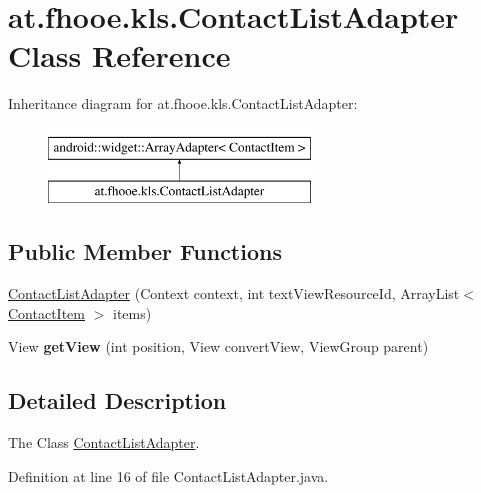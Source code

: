 \hypertarget{classat_1_1fhooe_1_1kls_1_1_contact_list_adapter}{\section{at.\-fhooe.\-kls.\-Contact\-List\-Adapter Class Reference}
\label{classat_1_1fhooe_1_1kls_1_1_contact_list_adapter}
}
Inheritance diagram for at.\-fhooe.\-kls.\-Contact\-List\-Adapter\-:\begin{figure}[H]
\begin{center}
\leavevmode
\includegraphics[height=2.000000cm]{classat_1_1fhooe_1_1kls_1_1_contact_list_adapter}
\end{center}
\end{figure}
\subsection*{Public Member Functions}
\begin{DoxyCompactItemize}
\item 
\hyperlink{classat_1_1fhooe_1_1kls_1_1_contact_list_adapter_a693544ab74ebbf47d3a5a9f7549087c9}{Contact\-List\-Adapter} (Context context, int text\-View\-Resource\-Id, Array\-List$<$ \hyperlink{classat_1_1fhooe_1_1kls_1_1_contact_item}{Contact\-Item} $>$ items)
\item 
\hypertarget{classat_1_1fhooe_1_1kls_1_1_contact_list_adapter_a99359a6cbb2a064fa46c2aef14e5b8eb}{View {\bfseries get\-View} (int position, View convert\-View, View\-Group parent)}\label{classat_1_1fhooe_1_1kls_1_1_contact_list_adapter_a99359a6cbb2a064fa46c2aef14e5b8eb}

\end{DoxyCompactItemize}


\subsection{Detailed Description}
The Class \hyperlink{classat_1_1fhooe_1_1kls_1_1_contact_list_adapter}{Contact\-List\-Adapter}. 

Definition at line 16 of file Contact\-List\-Adapter.\-java.



